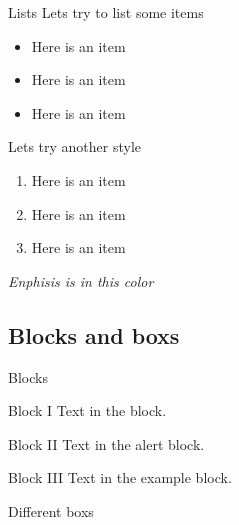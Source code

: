 \documentclass{libs/SUSTech_format}
\begin{document}
\begin{frame}{Lists}
    Lets try to list some items
    \begin{itemize}
        \item Here is an item
        \item Here is an item
        \item Here is an item
    \end{itemize}

    \vspace{0.4cm} %
    
    Lets try another style
    \begin{enumerate}
        \item Here is an item
        \item Here is an item
        \item Here is an item
    \end{enumerate}

    \vspace{0.2cm}

     \emph{Enphisis is in this color}
\end{frame}

\subsection{Blocks and boxs}
\begin{frame}{Blocks}
    \begin{block}{Block I}
        Text in the block.
    \end{block}

    \begin{alertblock}{Block II}
        Text in the alert block.
    \end{alertblock}

    \begin{exampleblock}{Block III}
        Text in the example block.
    \end{exampleblock}   
\end{frame}



\begin{frame}{Different boxs}
    
    \pause


    \pause

\end{frame}
\end{document}
